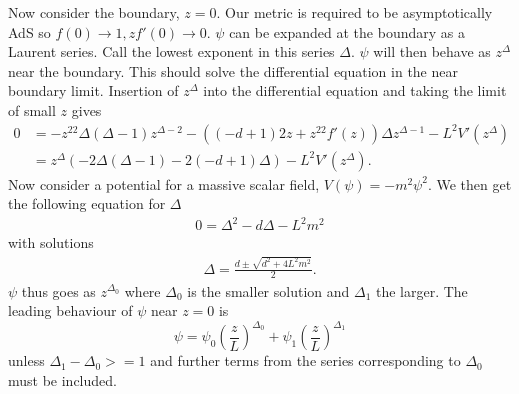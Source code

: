 \documentclass[12pt]{article}
\begin{document}
Now consider the boundary, $z=0$. Our metric is required to be asymptotically AdS so $f(0)\rightarrow1, zf'(0)\rightarrow0$. $\psi$ can be expanded at the boundary as a Laurent series. Call the lowest exponent in this series $\Delta$. $\psi$ will then behave as $z^\Delta$ near the boundary. This should solve the differential equation in the near boundary limit. Insertion of $z^\Delta$ into the differential equation and taking the limit of small $z$ gives
\begin{equation}
\begin{split}
0&=-z^22\Delta(\Delta-1)z^{\Delta-2}-\left((-d+1)2z + z^22f'(z)\right)\Delta z^{\Delta-1} -L^2V'(z^{\Delta})\\
&=z^{\Delta}\left(-2\Delta(\Delta-1)-2(-d+1)\Delta\right)-L^2V'(z^{\Delta}).
\end{split}
\end{equation}
Now consider a potential for a massive scalar field, $V(\psi)=-m^2\psi^2$. We then get the following equation for $\Delta$
\begin{equation}
\begin{split}
0=\Delta^2-d\Delta-L^2m^2
\end{split}
\end{equation}
with solutions
\begin{equation}
\begin{split}
\Delta=\frac{d\pm\sqrt{d^2+4L^2m^2}}{2}.
\end{split}
\end{equation}
$\psi$ thus goes as $z^{\Delta_0}$ where $\Delta_0$ is the smaller solution and $\Delta_1$ the larger. The leading behaviour of $\psi$ near $z=0$ is
\begin{equation}
 \psi=\psi_0\left(\frac{z}{L}\right)^{\Delta_0}+\psi_1\left(\frac{z}{L}\right)^{\Delta_1}
\end{equation}
unless $\Delta_1-\Delta_0>=1$ and further terms from the series corresponding to $\Delta_0$ must be included.\\
\end{document}
